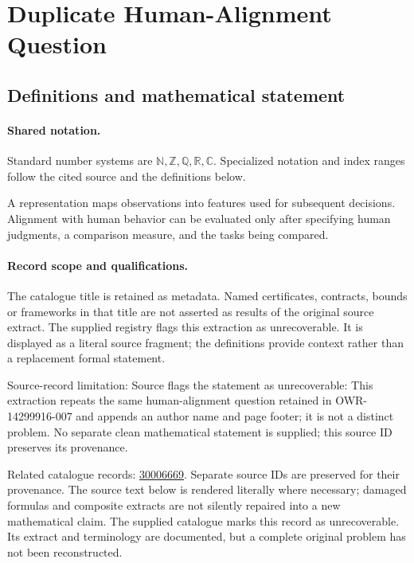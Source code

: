 \documentclass[11pt]{article}
\begin{document}
\section{Duplicate Human-Alignment Question}\label{statement}

\subsection{Definitions and mathematical statement}

\paragraph{Shared notation.}Standard number systems are $\mathbb N,\mathbb Z,\mathbb Q,\mathbb R,\mathbb C$. Specialized notation and index ranges follow the cited source and the definitions below.


A representation maps observations into features used for subsequent decisions. Alignment with human behavior can be evaluated only after specifying human judgments, a comparison measure, and the tasks being compared.
\paragraph{Record scope and qualifications.}
The catalogue title is retained as metadata. Named certificates, contracts, bounds or frameworks in that title are not asserted as results of the original source extract.
The supplied registry flags this extraction as unrecoverable. It is displayed as a literal source fragment; the definitions provide context rather than a replacement formal statement.

Source-record limitation: Source flags the statement as unrecoverable: This extraction repeats the same human-alignment question retained in OWR-14299916-007 and appends an author name and page footer; it is not a distinct problem. No separate clean mathematical statement is supplied; this source ID preserves its provenance.

Related catalogue records: \href{https://mehmetmars7.github.io/Erdosproblems-llm-hunter/problem.html?type=open_problems&id=30006669}{30006669}. Separate source IDs are preserved for their provenance.
The source text below is rendered literally where necessary; damaged formulas and composite extracts are not silently repaired into a new mathematical claim.
The supplied catalogue marks this record as unrecoverable. Its extract and terminology are documented, but a complete original problem has not been reconstructed.
\end{document}
